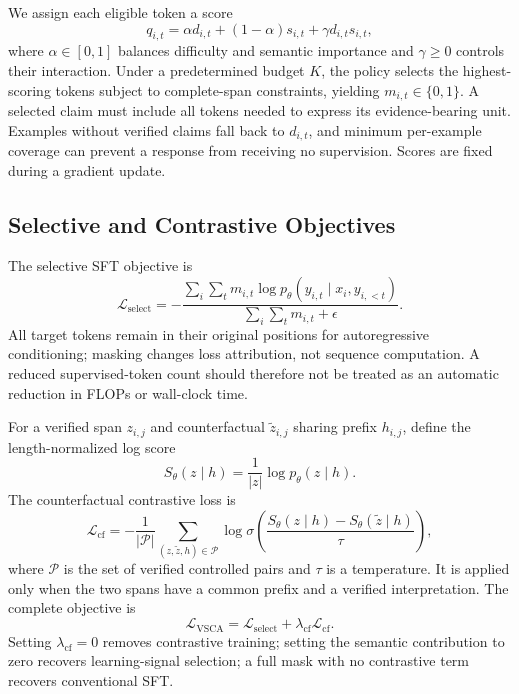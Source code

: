 \documentclass{article}
\newcommand{\loss}{\mathcal{L}}
\begin{document}
We assign each eligible token a score
\begin{equation}
 q_{i,t}=\alpha d_{i,t}+(1-\alpha)s_{i,t}+\gamma d_{i,t}s_{i,t},
 \label{eq:selection}
\end{equation}
where $\alpha\in[0,1]$ balances difficulty and semantic importance and $\gamma\geq0$ controls their interaction. Under a predetermined budget $K$, the policy selects the highest-scoring tokens subject to complete-span constraints, yielding $m_{i,t}\in\{0,1\}$. A selected claim must include all tokens needed to express its evidence-bearing unit. Examples without verified claims fall back to $d_{i,t}$, and minimum per-example coverage can prevent a response from receiving no supervision. Scores are fixed during a gradient update.

\subsection{Selective and Contrastive Objectives}
The selective SFT objective is
\begin{equation}
 \loss_{\mathrm{select}}=-\frac{\sum_i\sum_t m_{i,t}\log p_\theta(y_{i,t}\mid x_i,y_{i,<t})}{\sum_i\sum_t m_{i,t}+\epsilon}.
 \label{eq:selective}
\end{equation}
All target tokens remain in their original positions for autoregressive conditioning; masking changes loss attribution, not sequence computation. A reduced supervised-token count should therefore not be treated as an automatic reduction in FLOPs or wall-clock time.

For a verified span $z_{i,j}$ and counterfactual $\tilde z_{i,j}$ sharing prefix $h_{i,j}$, define the length-normalized log score
\begin{equation}
 S_\theta(z\mid h)=\frac{1}{|z|}\log p_\theta(z\mid h).
\end{equation}
The counterfactual contrastive loss is
\begin{equation}
 \loss_{\mathrm{cf}}=-\frac{1}{|\mathcal P|}\sum_{(z,\tilde z,h)\in\mathcal P}\log \sigma\left(\frac{S_\theta(z\mid h)-S_\theta(\tilde z\mid h)}{\tau}\right),
 \label{eq:contrastive}
\end{equation}
where $\mathcal P$ is the set of verified controlled pairs and $\tau$ is a temperature. It is applied only when the two spans have a common prefix and a verified interpretation. The complete objective is
\begin{equation}
 \loss_{\mathrm{VSCA}}=\loss_{\mathrm{select}}+\lambda_{\mathrm{cf}}\loss_{\mathrm{cf}}.
 \label{eq:full-objective}
\end{equation}
Setting $\lambda_{\mathrm{cf}}=0$ removes contrastive training; setting the semantic contribution to zero recovers learning-signal selection; a full mask with no contrastive term recovers conventional SFT.
\end{document}
